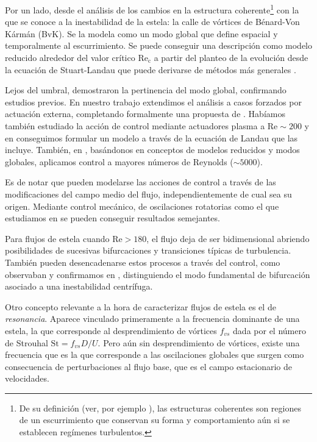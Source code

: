 \documentclass[12pt]{article}
\begin{document}
 Por un lado, desde el análisis de los cambios en la estructura coherente\footnote{ De su definición (ver, por ejemplo \cite{hussain1986}), las estructuras coherentes son regiones de un escurrimiento que conservan su forma y comportamiento aún si se establecen regímenes turbulentos.} con la que se conoce a la inestabilidad de la estela: la calle de vórtices de Bénard-Von Kármán (BvK).  Se la modela como un modo global \cite{zielinska,barkley2006} que define espacial y temporalmente al escurrimiento. Se puede conseguir una descripción como modelo reducido alrededor del valor crítico $\mathrm{Re_c}$ a partir del planteo de la evolución desde la ecuación de Stuart-Landau\cite{stuart58, provansal1987} que puede derivarse de métodos más generales \cite{noack2003a,dadamo2007}.
 
 
 Lejos del umbral, \citet{gallaire2016} demostraron  la pertinencia del modo global, confirmando estudios previos\cite{barkley2006,sipp2007}. En nuestro trabajo \cite{boury2018forced} extendimos el análisis a casos forzados por actuación externa, completando formalmente una propuesta de \cite{thiria2007}. Habíamos también  estudiado la acción de control mediante actuadores plasma\cite{dadamo2012} a $\mathrm{Re}\sim 200$ y en \cite{boury2018forced} conseguimos formular un modelo a través de la ecuación de Landau que las incluye. También, en \citet{dadamo2017a}, basándonos en conceptos de modelos reducidos y modos globales, aplicamos control a mayores números de Reynolds ($\sim 5000$).
 
  Es de notar que pueden modelarse las acciones de control a través de las modificaciones del campo medio del flujo, independientemente de cual sea su origen. Mediante control mecánico, de oscilaciones rotatorias  como el que estudiamos en \cite{dadamo2011b} se pueden conseguir resultados semejantes.

 Para flujos de estela cuando $\mathrm{Re}>180$, el flujo deja de ser bidimensional abriendo posibilidades de sucesivas bifurcaciones y transiciones típicas de turbulencia. También pueden desencadenarse estos procesos a través del control, como observaban \cite{thiria2007,dadamo2011b} y confirmamos en \cite{dadamo2015a}, distinguiendo el modo fundamental de bifurcación asociado a una inestabilidad centrífuga. 
 
 Otro concepto relevante a la hora de caracterizar flujos de estela es el de \textit{resonancia}. Aparece vinculado primeramente a la frecuencia dominante de una estela, la que corresponde al desprendimiento de vórtices $f_{vs}$ dada por el número de Strouhal $\mathrm{St}=f_{vs}D/U$. Pero aún sin desprendimiento de vórtices, existe una frecuencia que es la que corresponde a las oscilaciones globales que surgen como consecuencia de perturbaciones al flujo base, que es el campo estacionario de velocidades. 
 
\end{document}
